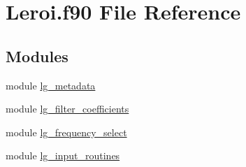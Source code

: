 \hypertarget{Leroi_8f90}{}\section{Leroi.\+f90 File Reference}
\label{Leroi_8f90}
\subsection*{Modules}
\begin{DoxyCompactItemize}
\item 
module \hyperlink{namespacelg__metadata}{lg\+\_\+metadata}
\item 
module \hyperlink{namespacelg__filter__coefficients}{lg\+\_\+filter\+\_\+coefficients}
\item 
module \hyperlink{namespacelg__frequency__select}{lg\+\_\+frequency\+\_\+select}
\item 
module \hyperlink{namespacelg__input__routines}{lg\+\_\+input\+\_\+routines}
\end{DoxyCompactItemize}

